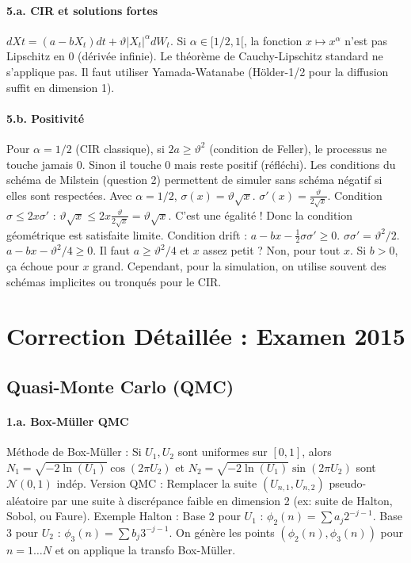 \documentclass[a4paper,11pt]{article}
\begin{document}
\paragraph{5.a. CIR et solutions fortes}
$dXt = (a - bX_t)dt + \vartheta |X_t|^\alpha dW_t$.
Si $\alpha \in [1/2, 1[$, la fonction $x \mapsto x^\alpha$ n'est pas Lipschitz en 0 (dérivée infinie). Le théorème de Cauchy-Lipschitz standard ne s'applique pas. Il faut utiliser Yamada-Watanabe (Hölder-1/2 pour la diffusion suffit en dimension 1).

\paragraph{5.b. Positivité}
Pour $\alpha=1/2$ (CIR classique), si $2a \ge \vartheta^2$ (condition de Feller), le processus ne touche jamais 0. Sinon il touche 0 mais reste positif (réfléchi).
Les conditions du schéma de Milstein (question 2) permettent de simuler sans schéma négatif si elles sont respectées.
Avec $\alpha=1/2$, $\sigma(x) = \vartheta \sqrt{x}$. $\sigma'(x) = \frac{\vartheta}{2\sqrt{x}}$.
Condition $\sigma \le 2x \sigma'$ : $\vartheta \sqrt{x} \le 2x \frac{\vartheta}{2\sqrt{x}} = \vartheta \sqrt{x}$. C'est une égalité ! Donc la condition géométrique est satisfaite limite.
Condition drift : $a - bx - \frac{1}{2}\sigma\sigma' \ge 0$.
$\sigma \sigma' = \vartheta^2 / 2$.
$a - bx - \vartheta^2/4 \ge 0$.
Il faut $a \ge \vartheta^2/4$ et $x$ assez petit ? Non, pour tout $x$. Si $b > 0$, ça échoue pour $x$ grand.
Cependant, pour la simulation, on utilise souvent des schémas implicites ou tronqués pour le CIR.

\newpage

\section{Correction Détaillée : Examen 2015}

\subsection{Quasi-Monte Carlo (QMC)}

\paragraph{1.a. Box-Müller QMC}
Méthode de Box-Müller : Si $U_1, U_2$ sont uniformes sur $[0,1]$, alors
$N_1 = \sqrt{-2\ln(U_1)} \cos(2\pi U_2)$ et $N_2 = \sqrt{-2\ln(U_1)} \sin(2\pi U_2)$ sont $\mathcal{N}(0,1)$ indép.
Version QMC : Remplacer la suite $(U_{n,1}, U_{n,2})$ pseudo-aléatoire par une suite à discrépance faible en dimension 2 (ex: suite de Halton, Sobol, ou Faure).
Exemple Halton :
Base 2 pour $U_1$ : $\phi_2(n) = \sum a_j 2^{-j-1}$.
Base 3 pour $U_2$ : $\phi_3(n) = \sum b_j 3^{-j-1}$.
On génère les points $(\phi_2(n), \phi_3(n))$ pour $n=1 \dots N$ et on applique la transfo Box-Müller.
\end{document}
